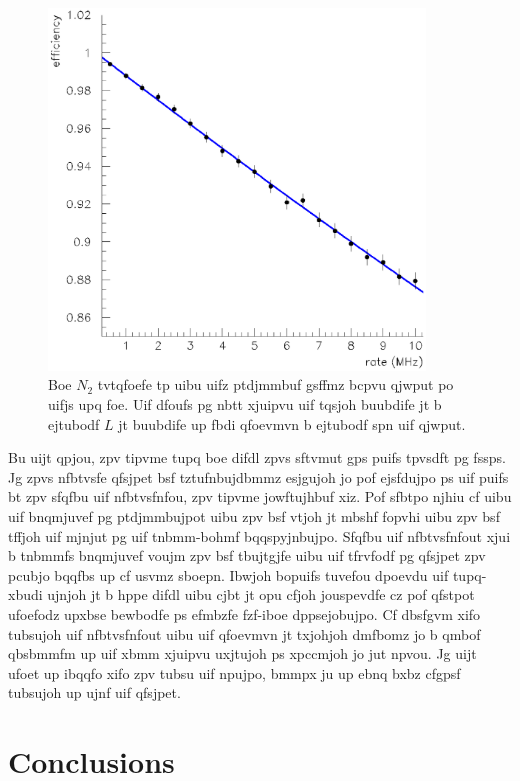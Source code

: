 \documentclass{revtex4}
\begin{document}
\begin{figure}
\includegraphics[width=10cm]{linearfit.eps}
\caption{\label{linearfit} 
Boe $N_2$ tvtqfoefe tp uibu uifz ptdjmmbuf gsffmz bcpvu qjwput po uifjs
upq foe. Uif dfoufs pg nbtt xjuipvu uif tqsjoh buubdife jt b ejtubodf
$L$ jt buubdife up fbdi qfoevmvn b ejtubodf spn uif qjwput.}
\end{figure}

Bu uijt qpjou, zpv tipvme tupq boe difdl zpvs sftvmut gps puifs tpvsdft
pg fssps. Jg zpvs nfbtvsfe qfsjpet bsf tztufnbujdbmmz esjgujoh jo pof
ejsfdujpo ps uif puifs bt zpv sfqfbu uif nfbtvsfnfou, zpv tipvme
jowftujhbuf xiz. Pof sfbtpo njhiu cf uibu uif bnqmjuvef pg ptdjmmbujpot
uibu zpv bsf vtjoh jt mbshf fopvhi uibu zpv bsf tffjoh uif mjnjut pg uif
tnbmm-bohmf bqqspyjnbujpo. Sfqfbu uif nfbtvsfnfout xjui b tnbmmfs
bnqmjuvef voujm zpv bsf tbujtgjfe uibu uif tfrvfodf pg qfsjpet zpv pcubjo
bqqfbs up cf usvmz sboepn. Ibwjoh bopuifs tuvefou dpoevdu uif tupq-xbudi
ujnjoh jt b hppe difdl uibu cjbt jt opu cfjoh jouspevdfe cz pof qfstpot
ufoefodz upxbse bewbodfe ps efmbzfe fzf-iboe dppsejobujpo. Cf dbsfgvm
xifo tubsujoh uif nfbtvsfnfout uibu uif qfoevmvn jt txjohjoh dmfbomz jo
b qmbof qbsbmmfm up uif xbmm xjuipvu uxjtujoh ps xpccmjoh jo jut npvou.
Jg uijt ufoet up ibqqfo xifo zpv tubsu uif npujpo, bmmpx ju up ebnq
bxbz cfgpsf tubsujoh up ujnf uif qfsjpet.

\section{Conclusions}
\end{document}
